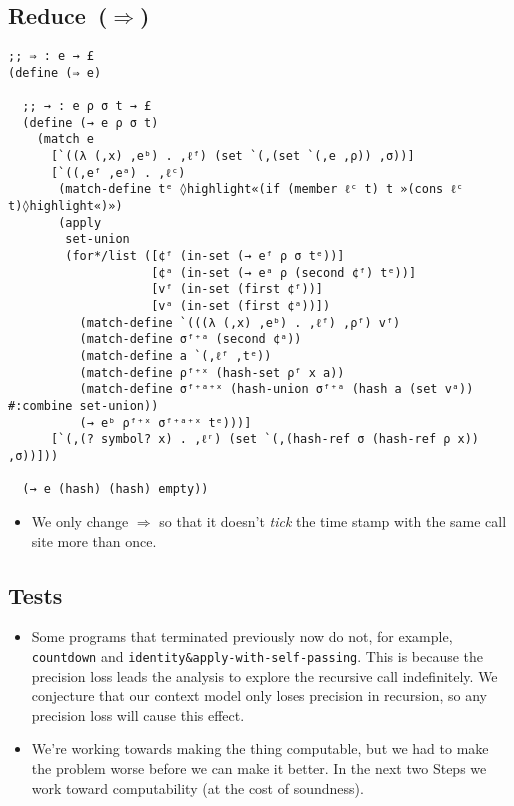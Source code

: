 \documentclass[12pt, oneside]{book}
\begin{document}
\subsection{Reduce~(\(⇒\))}

\begin{Verbatim}
;; ⇒ : e → £
(define (⇒ e)

  ;; → : e ρ σ t → £
  (define (→ e ρ σ t)
    (match e
      [`((λ (,x) ,eᵇ) . ,ℓᶠ) (set `(,(set `(,e ,ρ)) ,σ))]
      [`((,eᶠ ,eᵃ) . ,ℓᶜ)
       (match-define tᵉ ◊highlight«(if (member ℓᶜ t) t »(cons ℓᶜ t)◊highlight«)»)
       (apply
        set-union
        (for*/list ([¢ᶠ (in-set (→ eᶠ ρ σ tᵉ))]
                    [¢ᵃ (in-set (→ eᵃ ρ (second ¢ᶠ) tᵉ))]
                    [vᶠ (in-set (first ¢ᶠ))]
                    [vᵃ (in-set (first ¢ᵃ))])
          (match-define `(((λ (,x) ,eᵇ) . ,ℓᶠ) ,ρᶠ) vᶠ)
          (match-define σᶠ⁺ᵃ (second ¢ᵃ))
          (match-define a `(,ℓᶠ ,tᵉ))
          (match-define ρᶠ⁺ˣ (hash-set ρᶠ x a))
          (match-define σᶠ⁺ᵃ⁺ˣ (hash-union σᶠ⁺ᵃ (hash a (set vᵃ)) #:combine set-union))
          (→ eᵇ ρᶠ⁺ˣ σᶠ⁺ᵃ⁺ˣ tᵉ)))]
      [`(,(? symbol? x) . ,ℓʳ) (set `(,(hash-ref σ (hash-ref ρ x)) ,σ))]))

  (→ e (hash) (hash) empty))
\end{Verbatim}

\begin{itemize}
  \item We only change \(⇒\) so that it doesn’t \emph{tick} the time stamp with the same call site more than once.
\end{itemize}

\subsection{Tests}

\begin{itemize}
  \item Some programs that terminated previously now do not, for example, \texttt{countdown} and \texttt{identity\&apply-with-self-passing}. This is because the precision loss leads the analysis to explore the recursive call indefinitely. We conjecture that our context model only loses precision in recursion, so any precision loss will cause this effect.
  \item We’re working towards making the thing computable, but we had to make the problem worse before we can make it better. In the next two Steps we work toward computability (at the cost of soundness).
\end{itemize}
\end{document}
